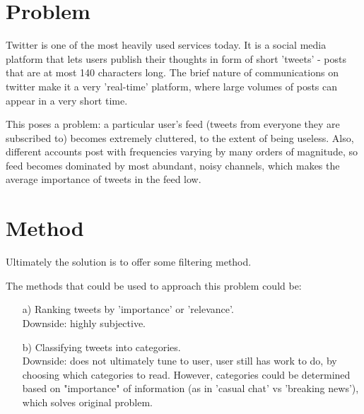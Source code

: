 \documentclass[%
 reprint,
 amsmath,amssymb,
 aps,
]{revtex4-1}
\begin{document}
\maketitle


\section{\label{sec:level1}Problem}


Twitter is one of the most heavily used services today. 
It is a social media platform that lets users publish their thoughts in form of short 'tweets' - posts that are at most 140 characters long.
The brief nature of communications on twitter make it a very 'real-time' platform, where large volumes of posts can appear in a very short time.

This poses a problem: a particular user's feed (tweets from everyone they are subscribed to) becomes extremely cluttered, to the extent of being useless. Also, different accounts post with frequencies varying by many orders of magnitude, so feed becomes dominated by most abundant, noisy channels, which makes the average importance of tweets in the feed low.



\section{Method}

Ultimately the solution is to offer some filtering method.

The methods that could be used to approach this problem could be:
\begin{itemize}
    \item[a)] Ranking tweets by 'importance' or 'relevance'. \\
    Downside: highly subjective.

    \item[b)] Classifying tweets into categories.\\
	Downside: does not ultimately tune to user, user still has work to do, by choosing which categories to read. 
	However, categories could be determined based on "importance" of information (as in 'casual chat' vs 'breaking news'), which solves original problem.
\end{itemize}
\end{document}
